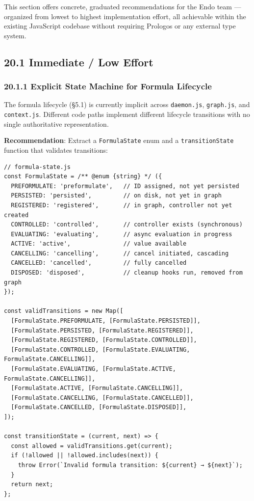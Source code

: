 \documentclass[11pt]{article}
\begin{document}
This section offers concrete, graduated recommendations for the Endo team
--- organized from lowest to highest implementation effort, all achievable
within the existing JavaScript codebase without requiring Prologos or any
external type system.
\subsection{20.1 Immediate / Low Effort}
\label{sec:org6372f02}

\subsubsection{20.1.1 Explicit State Machine for Formula Lifecycle}
\label{sec:org0b3707a}

The formula lifecycle (§5.1) is currently implicit across \texttt{daemon.js},
\texttt{graph.js}, and \texttt{context.js}. Different code paths implement different
lifecycle transitions with no single authoritative representation.

\textbf{Recommendation}: Extract a \texttt{FormulaState} enum and a \texttt{transitionState}
function that validates transitions:

\begin{verbatim}
// formula-state.js
const FormulaState = /** @enum {string} */ ({
  PREFORMULATE: 'preformulate',   // ID assigned, not yet persisted
  PERSISTED: 'persisted',         // on disk, not yet in graph
  REGISTERED: 'registered',       // in graph, controller not yet created
  CONTROLLED: 'controlled',       // controller exists (synchronous)
  EVALUATING: 'evaluating',       // async evaluation in progress
  ACTIVE: 'active',               // value available
  CANCELLING: 'cancelling',       // cancel initiated, cascading
  CANCELLED: 'cancelled',         // fully cancelled
  DISPOSED: 'disposed',           // cleanup hooks run, removed from graph
});

const validTransitions = new Map([
  [FormulaState.PREFORMULATE, [FormulaState.PERSISTED]],
  [FormulaState.PERSISTED, [FormulaState.REGISTERED]],
  [FormulaState.REGISTERED, [FormulaState.CONTROLLED]],
  [FormulaState.CONTROLLED, [FormulaState.EVALUATING, FormulaState.CANCELLING]],
  [FormulaState.EVALUATING, [FormulaState.ACTIVE, FormulaState.CANCELLING]],
  [FormulaState.ACTIVE, [FormulaState.CANCELLING]],
  [FormulaState.CANCELLING, [FormulaState.CANCELLED]],
  [FormulaState.CANCELLED, [FormulaState.DISPOSED]],
]);

const transitionState = (current, next) => {
  const allowed = validTransitions.get(current);
  if (!allowed || !allowed.includes(next)) {
    throw Error(`Invalid formula transition: ${current} → ${next}`);
  }
  return next;
};
\end{verbatim}
\end{document}
